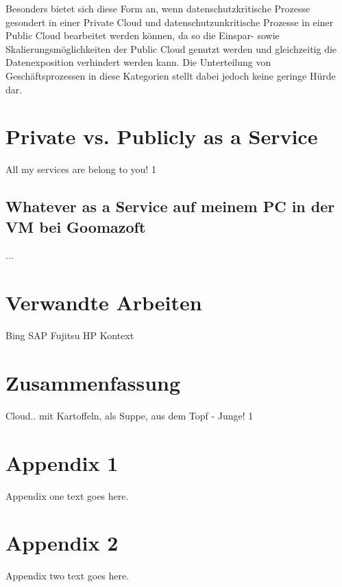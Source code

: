\documentclass[journal]{IEEEtran}
\begin{document}
Besonders bietet sich diese Form an, wenn datenschutzkritische Prozesse gesondert in einer Private Cloud und datenschutzunkritische Prozesse in einer Public Cloud bearbeitet werden können, da so die Einspar- sowie Skalierungsmöglichkeiten der Public Cloud genutzt werden und gleichzeitig die Datenexposition verhindert werden kann. Die Unterteilung von Geschäftsprozessen in diese Kategorien stellt dabei jedoch keine geringe Hürde dar.

\section{Private vs. Publicly as a Service}
All my services are belong to you!
1

\subsection{Whatever as a Service auf meinem PC in der VM bei Goomazoft}
...

\section{Verwandte Arbeiten}
Bing
SAP
Fujitsu
HP
Kontext

\section{Zusammenfassung}
Cloud.. mit Kartoffeln, als Suppe, aus dem Topf - Junge!
1

\appendices
\section{Appendix 1}
Appendix one text goes here.

\section{Appendix 2}
Appendix two text goes here.

\ifCLASSOPTIONcaptionsoff
  \newpage
\fi

\end{document}
